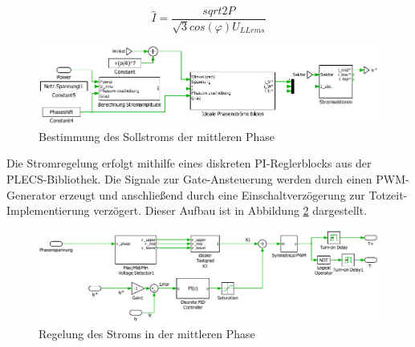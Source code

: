 		\begin{equation}
			\label{eq:Idach}
			 \hat{I} = \dfrac{sqrt{2} P   }{ \sqrt{3} cos(\varphi)   U_{LLrms} }
		\end{equation}
		
		\begin{figure}
			\centering
			\includegraphics[width=0.9\linewidth]{content/Grafiken/PlecsIAFiy}
			\caption{Bestimmung des Sollstroms der mittleren Phase}
			\label{fig:plecsiafiy}
		\end{figure}
		
Die Stromregelung erfolgt mithilfe eines diskreten PI-Reglerblocks aus der PLECS-Bibliothek. Die Signale zur Gate-Ansteuerung werden durch einen PWM-Generator erzeugt und anschließend durch eine Einschaltverzögerung zur Totzeit-Implementierung verzögert. Dieser Aufbau ist in Abbildung \ref{fig:plecsiafivsk1} dargestellt. 
		\begin{figure}
			\centering
			\includegraphics[width=1\linewidth]{content/Grafiken/PlecsIAFivsK1}
			\caption{Regelung des Stroms in der mittleren Phase}
			\label{fig:plecsiafivsk1}
		\end{figure}
		
	

